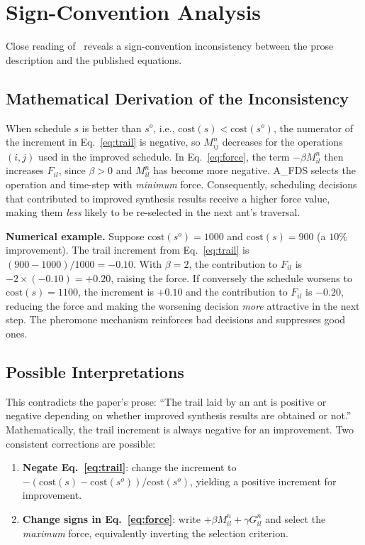 \documentclass[conference]{IEEEtran}
\begin{document}
\section{Sign-Convention Analysis}

Close reading of~\cite{kopuri2004aco} reveals a sign-convention
inconsistency between the prose description and the published equations.

\subsection{Mathematical Derivation of the Inconsistency}

When schedule $s$ is better than $s^{o}$, i.e., $\text{cost}(s) <
\text{cost}(s^{o})$, the numerator of the increment in Eq.~\eqref{eq:trail}
is negative, so $M^{n}_{ij}$ decreases for the operations $(i,j)$ used
in the improved schedule. In Eq.~\eqref{eq:force}, the term $-\beta
M^{n}_{il}$ then increases $F_{il}$, since $\beta > 0$ and $M^{n}_{il}$
has become more negative. A\_FDS selects the operation and time-step with
\emph{minimum} force. Consequently, scheduling decisions that contributed
to improved synthesis results receive a higher force value, making them
\emph{less} likely to be re-selected in the next ant's traversal.

\textbf{Numerical example.} Suppose $\text{cost}(s^{o}) = 1000$ and
$\text{cost}(s) = 900$ (a $10\%$ improvement). The trail increment from
Eq.~\eqref{eq:trail} is $(900 - 1000)/1000 = -0.10$. With $\beta = 2$,
the contribution to $F_{il}$ is $-2 \times (-0.10) = +0.20$, raising the
force. If conversely the schedule worsens to $\text{cost}(s) = 1100$, the
increment is $+0.10$ and the contribution to $F_{il}$ is $-0.20$, reducing
the force and making the worsening decision \emph{more} attractive in the
next step. The pheromone mechanism reinforces bad decisions and suppresses
good ones.

\subsection{Possible Interpretations}

This contradicts the paper's prose: ``The trail laid by an ant is
positive or negative depending on whether improved synthesis results are
obtained or not.'' Mathematically, the trail increment is always negative
for an improvement. Two consistent corrections are possible:
\begin{enumerate}
  \item \textbf{Negate Eq.~\eqref{eq:trail}}: change the increment to
        $-(\text{cost}(s) - \text{cost}(s^{o}))/\text{cost}(s^{o})$,
        yielding a positive increment for improvement.
  \item \textbf{Change signs in Eq.~\eqref{eq:force}}: write
        $+\beta M^{n}_{il} + \gamma G^{n}_{il}$ and select the
        \emph{maximum} force, equivalently inverting the selection
        criterion.
\end{enumerate}
\end{document}
